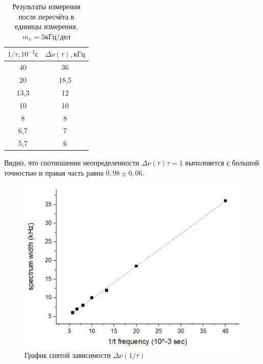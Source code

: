 \documentclass[a4paper, fontsize = 14pt]{article}
\begin{document}
\begin{table}[hbt]
\centering
\begin{tabular}{|c|c|}
\hline
\textbf{$1/ \tau, 10^{-3} с$} & \textbf{$\Delta \nu(\tau), кГц$} \\ \hline
40                            & 36                               \\ \hline
20                            & 18,5                             \\ \hline
13,3                          & 12                               \\ \hline
10                            & 10                               \\ \hline
8                             & 8                                \\ \hline
6,7                           & 7                                \\ \hline
5,7                           & 6                                \\ \hline
\end{tabular}
\caption{Результаты измерения после пересчёта в единицы измерения, $m_x = 5 кГц/дел$}
\end{table}

Видно, что соотношение неопределенности $\Delta \nu(\tau) \tau = 1$ выполняется с большой точностью и правая часть равна $0,98 \pm 0,06$.

\begin{figure}[hbt]
	\centering
	\includegraphics[scale=0.5]{lab361ris2.png}
	\caption{График снятой зависимости $\Delta \nu(1 / \tau)$}
\end{figure}
\end{document}
